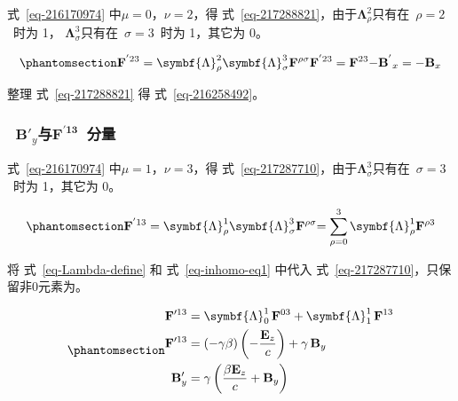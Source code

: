 \documentclass[
  chinese,
  a4paper,
  UTF8,
  12pt,
  oneside,
  openany]{ctexbook}
\begin{document}
式~\ref{eq-216170974} 中\(\mu = 0\)，\(\nu = 2\)，得
式~\ref{eq-217288821}，由于\(\symbf{\Lambda}_{\rho}^{2}\)只有在~\(\rho = 2\)~时为
1， \(\symbf{\Lambda}_{\sigma}^{3}\)只有在~\(\sigma = 3\)~时为 1，其它为
0。

\begin{equation}\protect\phantomsection\label{eq-217288821}{
{\mathbf{F}^{'23} = \symbf{\Lambda}_{\rho}^{2}\symbf{\Lambda}_{\sigma}^{3}\mathbf{F}^{\rho\sigma}
  }{\mathbf{F}^{'23} = \mathbf{F}^{23}
  }{- {\mathbf{B}^{\mathbf{'}}}_{x} = - \mathbf{B}_{x}}
}\end{equation}

整理 式~\ref{eq-217288821} 得 式~\ref{eq-216258492}。

\subsubsection{\texorpdfstring{~\({\mathbf{B}'}_{y}\)与\(\mathbf{F}^{\mathbf{'13}}\)~分量}{~\{\textbackslash mathbf\{B\}\textquotesingle\}\_\{y\}与\textbackslash mathbf\{F\}\^{}\{\textbackslash mathbf\{\}\}~分量}}\label{mathbfb_yux4e0emathbffmathbf13-ux5206ux91cf}

式~\ref{eq-216170974} 中\(\mu = 1\)，\(\nu = 3\)，得
式~\ref{eq-217287710}，由于\(\symbf{\Lambda}_{\sigma}^{3}\)只有在~\(\sigma = 3\)~时为
1，其它为 0。

\begin{equation}\protect\phantomsection\label{eq-217287710}{
{\mathbf{F}^{'13} = \symbf{\Lambda}_{\rho}^{1}\symbf{\Lambda}_{\sigma}^{3}\mathbf{F}^{\rho\sigma}
  }{= \sum_{\rho = 0}^{3}{\symbf{\Lambda}_{\rho}^{1}\mathbf{F}^{\rho 3}}}
}\end{equation}

将 式~\ref{eq-Lambda-define} 和 式~\ref{eq-inhomo-eq1} 中代入
式~\ref{eq-217287710}，只保留非0元素为。

\begin{equation}\protect\phantomsection\label{eq-217288259}{
\begin{aligned}
\mathbf{F}'^{13}
&= \symbf{\Lambda}_{0}^{1}\,\mathbf{F}^{03} + \symbf{\Lambda}_{1}^{1}\,\mathbf{F}^{13} \\
\mathbf{F}'^{13}
&= (-\gamma\beta)\left(-\frac{\mathbf{E}_{z}}{c}\right) + \gamma\,\mathbf{B}_{y} \\
\mathbf{B}'_{y}
&= \gamma\left( \frac{\beta\mathbf{E}_{z}}{c} + \mathbf{B}_{y} \right)
\end{aligned}
}\end{equation}
\end{document}
